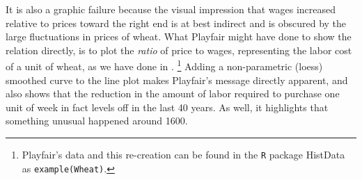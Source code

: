 It is also a graphic failure because the visual impression that wages increased relative to prices
toward the right end is at best indirect and is obscured by the large fluctuations in prices of wheat.
What Playfair might have done to show the relation directly, is to plot the \emph{ratio} of price to wages,
representing the labor cost of a unit of wheat, as we have done in .%
\footnote{
Playfair's data and this re-creation can be found in the \texttt{R} package HistData \citep{HistData}
as \texttt{example(Wheat)}.
}
Adding a non-parametric (loess) smoothed curve to the line plot makes Playfair's message directly apparent,
and also shows that the reduction in the amount of labor required to purchase one unit of week in fact
levels off in the last 40 years. As well, it highlights that something unusual happened around 1600.
